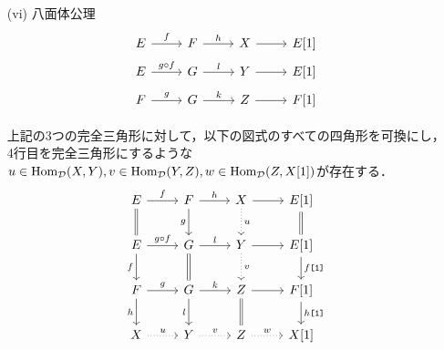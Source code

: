 \begin{defn}
\begin{itemize}
	\item[(vi)]
		八面体公理\\
			\[
				\begin{tikzcd}[row sep=5pt]
			E \ar[r,"f"]& F\ar[r,"h"]& X \ar[r]& E[1]\\
			E \ar[r,"g\circ f"]& G\ar[r,"l"]& Y \ar[r]& E[1]\\
			F \ar[r,"g"]& G\ar[r,"k"]& Z \ar[r]& F[1]\\
		\end{tikzcd}
			\]
			上記の3つの完全三角形に対して，以下の図式のすべての四角形を可換にし，4行目を完全三角形にするような$u\in\operatorname{\mathrm{Hom}}_{{\mathcal D}}(X,Y),v\in\operatorname{\mathrm{Hom}}_{{\mathcal D}}(Y,Z),w\in\operatorname{\mathrm{Hom}}_{{\mathcal D}}(Z,X[1])$が存在する．
			\[
		\begin{tikzcd}
			E \ar[r,"f"]\ar[d,equal]& F\ar[r,"h"]\ar[d,"g",swap]& X\ar[d,"u",dotted] \ar[r]& E[1]\ar[d,equal]\\
			E \ar[r,"g\circ f"]\ar[d,"f",swap]& G\ar[r,"l"]\ar[d,equal]& Y\ar[d,"v",dotted] \ar[r]& E[1]\ar[d,"f\texttt{[1]}"]\\
			F \ar[r,"g"]\ar[d,"h",swap]& G\ar[r,"k"]\ar[d,"l",swap]& Z \ar[r]\ar[d,equal]& F[1]\ar[d,"h\texttt{[1]}"]\\
			X \ar[r,"u",dotted]& Y\ar[r,"v",dotted]& Z \ar[r,"w",dotted]& X[1]\\
		\end{tikzcd}
			\]
	\end{itemize}
\end{defn}
